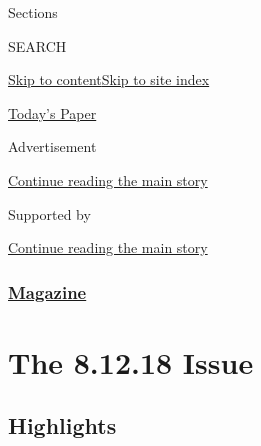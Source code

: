 Sections

SEARCH

\protect\hyperlink{site-content}{Skip to
content}\protect\hyperlink{site-index}{Skip to site index}

\href{https://myaccount.nytimes3xbfgragh.onion/auth/login?response_type=cookie\&client_id=vi}{}

\href{https://www.nytimes3xbfgragh.onion/section/todayspaper}{Today's
Paper}

Advertisement

\protect\hyperlink{after-top}{Continue reading the main story}

Supported by

\protect\hyperlink{after-sponsor}{Continue reading the main story}

\hypertarget{magazine}{%
\subsubsection{\texorpdfstring{\href{/section/magazine}{Magazine}}{Magazine}}\label{magazine}}

\hypertarget{the-81218-issue}{%
\section{The 8.12.18 Issue}\label{the-81218-issue}}

\hypertarget{highlights}{%
\subsection{Highlights}\label{highlights}}

